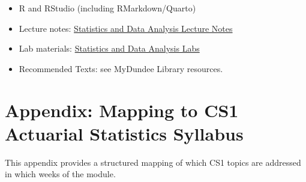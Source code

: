 \documentclass[
  a4paper,
  DIV=11,
  numbers=noendperiod,
  oneside]{scrreprt}
\providecommand{\tightlist}{%
  \setlength{\itemsep}{0pt}\setlength{\parskip}{0pt}}
\theoremstyle{definition}
\theoremstyle{definition}
\theoremstyle{plain}
\theoremstyle{plain}
\theoremstyle{definition}
\theoremstyle{remark}
\begin{document}

\begin{itemize}
\tightlist
\item
  R and RStudio (including RMarkdown/Quarto)\\
\item
  Lecture notes: \href{https://dundeemath.github.io/MA22004/}{Statistics
  and Data Analysis Lecture Notes}\\
\item
  Lab materials:
  \href{https://dundeemath.github.io/MA22004labs/}{Statistics and Data
  Analysis Labs}\\
\item
  Recommended Texts: see MyDundee Library resources.
\end{itemize}

\section*{Appendix: Mapping to CS1 Actuarial Statistics
Syllabus}\label{appendix-mapping-to-cs1-actuarial-statistics-syllabus}


This appendix provides a structured mapping of which CS1 topics are
addressed in which weeks of the module.
\end{document}
